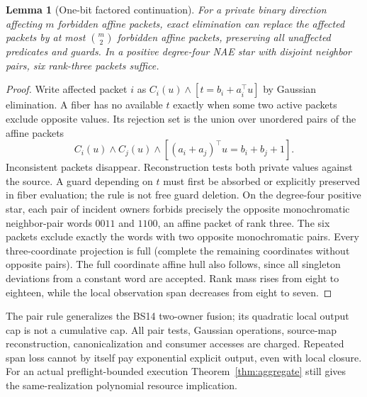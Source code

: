 \documentclass[11pt]{article}
\newtheorem{lemma}[theorem]{Lemma}
\begin{document}
\begin{lemma}[One-bit factored continuation]\label{lem:do18-factor}
For a private binary direction affecting $m$ forbidden affine packets, exact elimination can replace the affected packets by at most $\binom m2$ forbidden affine packets, preserving all unaffected predicates and guards. In a positive degree-four NAE star with disjoint neighbor pairs, six rank-three packets suffice.
\end{lemma}
\begin{proof}
Write affected packet $i$ as $C_i(u)\wedge[t=b_i+a_i^\top u]$ by Gaussian elimination. A fiber has no available $t$ exactly when some two active packets exclude opposite values. Its rejection set is the union over unordered pairs of the affine packets
\[
 C_i(u)\wedge C_j(u)\wedge[(a_i+a_j)^\top u=b_i+b_j+1].
\]
Inconsistent packets disappear. Reconstruction tests both private values against the source. A guard depending on $t$ must first be absorbed or explicitly preserved in fiber evaluation; the rule is not free guard deletion. On the degree-four positive star, each pair of incident owners forbids precisely the opposite monochromatic neighbor-pair words $0011$ and $1100$, an affine packet of rank three. The six packets exclude exactly the words with two opposite monochromatic pairs. Every three-coordinate projection is full (complete the remaining coordinates without opposite pairs). The full coordinate affine hull also follows, since all singleton deviations from a constant word are accepted. Rank mass rises from eight to eighteen, while the local observation span decreases from eight to seven.
\end{proof}
The pair rule generalizes the BS14 two-owner fusion; its quadratic local output cap is not a cumulative cap. All pair tests, Gaussian operations, source-map reconstruction, canonicalization and consumer accesses are charged. Repeated span loss cannot by itself pay exponential explicit output, even with local closure. For an actual preflight-bounded execution Theorem~\ref{thm:aggregate} still gives the same-realization polynomial resource implication.
\end{document}

